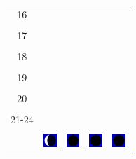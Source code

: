 \documentclass[a4paper,12pt, tikz]{scrartcl}
\begin{document}
\begin{tabularx}{\linewidth}{|c|X|X|p{2cm}|p{2cm}|}
            &   &       &    &   \\
          \hline
          16&   &                 &    &   \\
            &   &       &    &   \\
          \hline
          17&   &                 &    &   \\
            &   &       &    &   \\
          \hline
          18&   &                 &    &   \\
            &   &       &    &   \\
          \hline
          19&   &                 &     &   \\
            &   &       &    &   \\
          \hline
          20&   &              &    &   \\
            &   &       &    &   \\
          \hline 
          21-24&   &              &    &   \\
            &   &       &    &   \\
          \hline
                      & \vspace{0.01cm} \centerline{\includegraphics[width=0.5cm]{moon_phases/Moon_phase_7.svg.png}} \vspace{0.1cm} & \vspace{0.01cm} \centerline{\includegraphics[width=0.5cm]{moon_phases/Moon_phase_0.svg.png}} \vspace{0.1cm} & \vspace{0.01cm} \centerline{\includegraphics[width=0.5cm]{moon_phases/Moon_phase_0.svg.png}} \vspace{0.1cm} & \vspace{0.01cm} \centerline{\includegraphics[width=0.5cm]{moon_phases/Moon_phase_0.svg.png}} \vspace{0.1cm}\\
          \hline    
        \end{tabularx}
\end{document}
